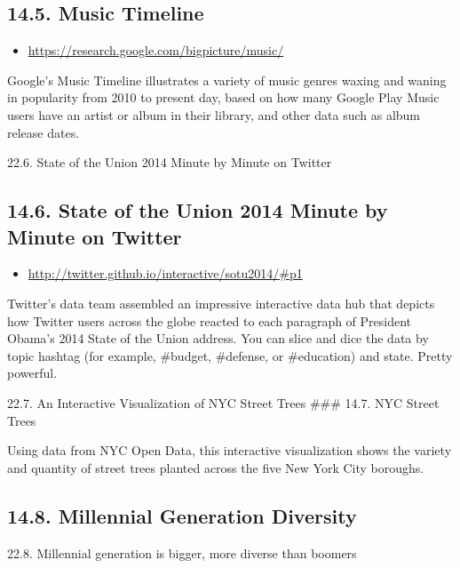 \documentclass[]{book}
\providecommand{\tightlist}{%
  \setlength{\itemsep}{0pt}\setlength{\parskip}{0pt}}
\theoremstyle{definition}
\theoremstyle{definition}
\theoremstyle{definition}
\theoremstyle{remark}
\begin{document}
\subsection{14.5. Music Timeline}\label{music-timeline}

\begin{itemize}
\tightlist
\item
  \url{https://research.google.com/bigpicture/music/}
\end{itemize}

Google's Music Timeline illustrates a variety of music genres waxing and
waning in popularity from 2010 to present day, based on how many Google
Play Music users have an artist or album in their library, and other
data such as album release dates.

22.6. State of the Union 2014 Minute by Minute on Twitter

\subsection{14.6. State of the Union 2014 Minute by Minute on
Twitter}\label{state-of-the-union-2014-minute-by-minute-on-twitter}

\begin{itemize}
\tightlist
\item
  \url{http://twitter.github.io/interactive/sotu2014/\#p1}
\end{itemize}

Twitter's data team assembled an impressive interactive data hub that
depicts how Twitter users across the globe reacted to each paragraph of
President Obama's 2014 State of the Union address. You can slice and
dice the data by topic hashtag (for example, \#budget, \#defense, or
\#education) and state. Pretty powerful.

22.7. An Interactive Visualization of NYC Street Trees \citep{trees}
\#\#\# 14.7. NYC Street Trees

Using data from NYC Open Data, this interactive visualization shows the
variety and quantity of street trees planted across the five New York
City boroughs.

\subsection{14.8. Millennial Generation
Diversity}\label{millennial-generation-diversity}

22.8. Millennial generation is bigger, more diverse than boomers
\citep{age_groups}
\end{document}
